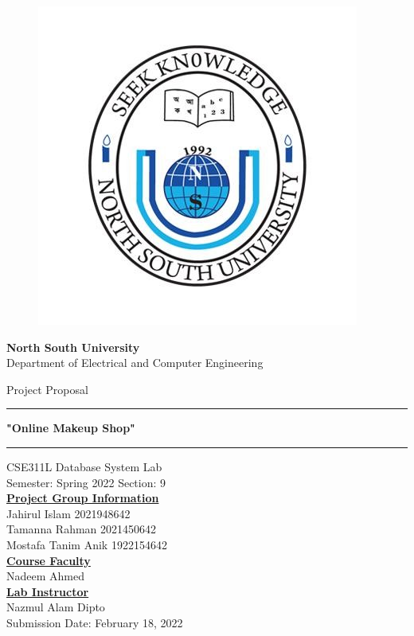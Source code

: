 \documentclass[12pt,letterpaper]{article}
\begin{document}
\begin{figure}
    \centering
    \includegraphics[scale=0.6]{nsulogo.jpg}
\end{figure}
\begin{center}
    \large {\bf North South University}\\
    Department of Electrical and Computer Engineering
\end{center}
\begin{center}
    \huge{Project Proposal}
\end{center}
\rule {\textwidth}{0.5pt}
\begin{Onlinemakeupshop}
\begin{center}
   \huge{} \textbf{"Online Makeup Shop"} 
\end{center}
\end{Onlinemakeupshop}
\rule{\textwidth}{0.5pt}

\begin{center}
    CSE311L Database System Lab\\
    Semester: Spring 2022 Section: 9\\
    \hfill \break
    \underline {\bf Project Group Information}\\
    Jahirul Islam 2021948642\\
    Tamanna Rahman 2021450642\\
    Mostafa Tanim Anik 1922154642\\
    \hfill \break
    \underline {\bf Course Faculty}\\
    Nadeem Ahmed\\
    
    \underline {\bf Lab Instructor}\\
    Nazmul Alam Dipto\\
    \hfill \break
    Submission Date: February 18, 2022

\end{center}
\end{document}
